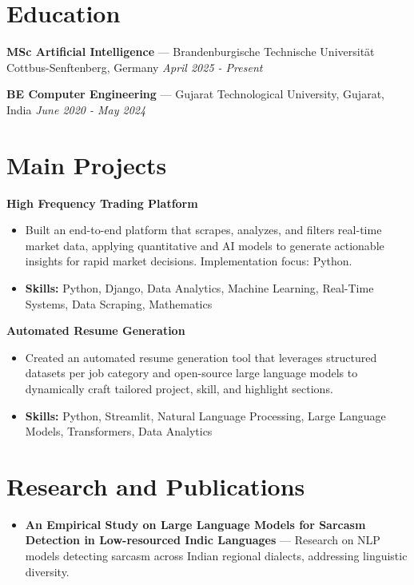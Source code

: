 \documentclass[a4paper,10pt]{article}
\begin{document}
\section*{Education}
\textbf{MSc Artificial Intelligence} — Brandenburgische Technische Universität Cottbus-Senftenberg, Germany \hfill \textit{April 2025 - Present}\par
\vspace{1.5pt}
\textbf{BE Computer Engineering} — Gujarat Technological University, Gujarat, India \hfill \textit{June 2020 - May 2024}\par

\section*{Main Projects}
\textbf{High Frequency Trading Platform}\par
\vspace{1pt}
\begin{itemize}
  \item Built an end-to-end platform that scrapes, analyzes, and filters real-time market data, applying quantitative and AI models to generate actionable insights for rapid market decisions. Implementation focus: Python.
  \item \textbf{Skills:} Python, Django, Data Analytics, Machine Learning, Real-Time Systems, Data Scraping, Mathematics
\end{itemize}
\vspace{3pt}
\textbf{Automated Resume Generation}\par
\vspace{1pt}
\begin{itemize}
  \item Created an automated resume generation tool that leverages structured datasets per job category and open-source large language models to dynamically craft tailored project, skill, and highlight sections.
  \item \textbf{Skills:} Python, Streamlit, Natural Language Processing, Large Language Models, Transformers, Data Analytics
\end{itemize}

\section*{Research and Publications}
\begin{itemize}
\item \textbf{An Empirical Study on Large Language Models for Sarcasm Detection in Low-resourced Indic Languages} — Research on NLP models detecting sarcasm across Indian regional dialects, addressing linguistic diversity.
\end{itemize}
\end{document}
